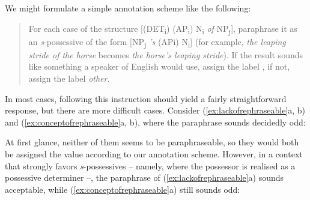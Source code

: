 We might formulate a simple annotation  scheme like the following:

\begin{quote}
For each case of the structure [(DET\textsubscript{i}) (AP\textsubscript{i}) N\textsubscript{i} \textit{of} NP\textsubscript{j}], paraphrase it as an \textit{s}-possessive  of the form [NP\textsubscript{j} \textit{'s} (APi) N\textsubscript{i}] (for example, \textit{the leaping stride of the horse} becomes \textit{the horse's leaping stride}). If the result sounds like something a speaker of English would use, assign the label , if not, assign the label \textit{other}.
\end{quote}

In most cases, following this instruction should yield a fairly straightforward response, but there are more difficult cases. Consider (\ref{ex:lackofrephraseable}a, b) and (\ref{ex:conceptofrephraseable}a, b), where the paraphrase sounds decidedly odd:

\begin{exe}
\ex
\begin{xlist}
\label{ex:lackofrephraseable}
\end{xlist}
\ex
\begin{xlist}
\label{ex:conceptofrephraseable}
\end{xlist}
\end{exe}

At first glance, neither of them seems to be paraphraseable, so they would both be assigned the value  according to our annotation  scheme. However, in a context that strongly favors \textit{s}-possessives  -- namely, where the possessor is realised as a possessive determiner  --, the paraphrase of (\ref{ex:lackofrephraseable}a) sounds acceptable,  while (\ref{ex:conceptofrephraseable}a) still sounds odd:

\begin{exe}
\ex
\begin{xlist}
\label{ex:ofpronrephraseable}
\end{xlist}
\end{exe}

